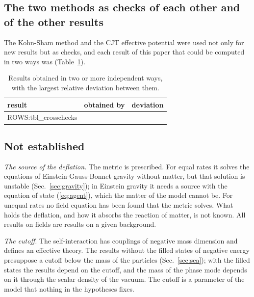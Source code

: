\subsection{The two methods as checks of each other and of the other results}
\label{sec:crosschecks}

The Kohn-Sham method and the CJT effective potential were used not only for new results but as
checks, and each result of this paper that could be computed in two ways was
(Table~\ref{tab:crosschecks}).

\begin{table}
\caption{\label{tab:crosschecks}Results obtained in two or more independent ways, with the largest
relative deviation between them.}
\begin{ruledtabular}
\begin{tabular}{p{}p{}c}
result & obtained by & deviation \\
\hline
{{ROWS:tbl_crosschecks}}
\end{tabular}
\end{ruledtabular}
\end{table}

\subsection{Not established}

\emph{The source of the deflation.} The metric is prescribed. For equal rates it solves the
equations of Einstein-Gauss-Bonnet gravity without matter, but that solution is unstable
(Sec.~\ref{sec:gravity}); in Einstein gravity it needs a source with the equation of state
(\ref{eq:agent}), which the matter of the model cannot be. For unequal rates no field equation has
been found that the metric solves. What holds the deflation, and how it absorbs the reaction of
matter, is not known. All results on fields are results on a given background.

\emph{The cutoff.} The self-interaction has couplings of negative mass dimension and defines an
effective theory. The results without the filled states of negative energy presuppose a cutoff below
the mass of the particles (Sec.~\ref{sec:sea}); with the filled states the results depend on the
cutoff, and the mass of the phase mode depends on it through the scalar density of the vacuum. The
cutoff is a parameter of the model that nothing in the hypotheses fixes.

